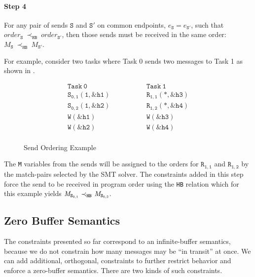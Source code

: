 \paragraph*{Step 4} For any pair of sends $\mathtt{S}$ and
$\mathtt{S'}$ on common endpoints, $e_{\mathtt{S}}=e_{\mathtt{S'}}$,
such that
$\mathit{order}_\mathtt{S}\ \mathrm{\prec_\mathtt{HB}}\ \mathit{order}_\mathtt{S'}$,
then those sends must be received in the same order:
$M_{\mathtt{S}}\ \mathrm{\prec_{\mathtt{HB}}}\ M_{\mathtt{S'}}$.

For example, consider two tasks where Task 0 sends two messages to
Task 1 as shown in .

\begin{figure}[h]
\[
\begin{array}{l|l}
\;\;\;\;\;\;\;\;\mathtt{Task\ 0}\;\;\;\;\;\;\;\; & \;\;\;\;\;\;\;\; \mathtt{Task\ 1}\;\;\;\;\;\;\;\; \\
\hline
\;\;\;\;\;\;\;\;\mathtt{S_{0,1}(1,\&h1)}\;\;\;\;\;\;\;\; & \;\;\;\;\;\;\;\; \mathtt{R_{1,1}(*,\&h3)}\;\;\;\;\;\;\;\; \\
\;\;\;\;\;\;\;\;\mathtt{S_{0,2}(1,\&h2)}\;\;\;\;\;\;\;\; & \;\;\;\;\;\;\;\; \mathtt{R_{1,2}(*,\&h4)}\;\;\;\;\;\;\;\; \\
\;\;\;\;\;\;\;\;\mathtt{W(\&h1)}\;\;\;\;\;\;\;\; & \;\;\;\;\;\;\;\; \mathtt{W(\&h3)}\;\;\;\;\;\;\;\; \\
\;\;\;\;\;\;\;\;\mathtt{W(\&h2)}\;\;\;\;\;\;\;\; & \;\;\;\;\;\;\;\; \mathtt{W(\&h4)}\;\;\;\;\;\;\;\; \\
\end{array}
\]
\caption{Send Ordering Example} \label{fig:step4}
\end{figure}

The \texttt{M} variables from the sends will be assigned to the orders
for $\mathtt{R_{1,1}}$ and $\mathtt{R_{1,2}}$ by the match-pairs
selected by the SMT solver. The constraints added in this step force
the send to be received in program order using the \texttt{HB}
relation which for this example yields
$\cfgnt{M}_\mathtt{S_{0,1}}\ \mathrm{\prec_\mathtt{HB}}\ \cfgnt{M}_\mathtt{S_{0,2}}$.

\subsection{Zero Buffer Semantics}

The constraints presented so far correspond to an infinite-buffer
semantics, because we do not constrain how many messages may be ``in
transit'' at once. We can add additional, orthogonal, constraints to
further restrict behavior and enforce a zero-buffer semantics. There are
two kinds of such constraints.

